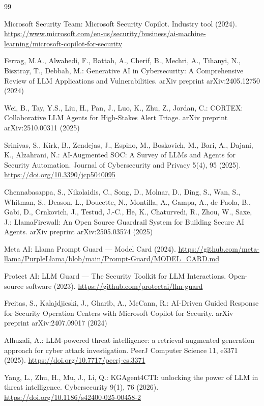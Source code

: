 \documentclass[twocolumn]{svjour3}
\begin{document}
\begin{thebibliography}{99}

Microsoft Security Team: Microsoft Security Copilot. Industry tool (2024). \url{https://www.microsoft.com/en-us/security/business/ai-machine-learning/microsoft-copilot-for-security}

Ferrag, M.A., Alwahedi, F., Battah, A., Cherif, B., Mechri, A., Tihanyi, N., Bisztray, T., Debbah, M.: Generative AI in Cybersecurity: A Comprehensive Review of LLM Applications and Vulnerabilities. arXiv preprint arXiv:2405.12750 (2024)

Wei, B., Tay, Y.S., Liu, H., Pan, J., Luo, K., Zhu, Z., Jordan, C.: CORTEX: Collaborative LLM Agents for High-Stakes Alert Triage. arXiv preprint arXiv:2510.00311 (2025)

Srinivas, S., Kirk, B., Zendejas, J., Espino, M., Boskovich, M., Bari, A., Dajani, K., Alzahrani, N.: AI-Augmented SOC: A Survey of LLMs and Agents for Security Automation. Journal of Cybersecurity and Privacy 5(4), 95 (2025). \url{https://doi.org/10.3390/jcp5040095}

Chennabasappa, S., Nikolaidis, C., Song, D., Molnar, D., Ding, S., Wan, S., Whitman, S., Deason, L., Doucette, N., Montilla, A., Gampa, A., de Paola, B., Gabi, D., Crnkovich, J., Testud, J.-C., He, K., Chaturvedi, R., Zhou, W., Saxe, J.: LlamaFirewall: An Open Source Guardrail System for Building Secure AI Agents. arXiv preprint arXiv:2505.03574 (2025)

Meta AI: Llama Prompt Guard --- Model Card (2024). \url{https://github.com/meta-llama/PurpleLlama/blob/main/Prompt-Guard/MODEL_CARD.md}

Protect AI: LLM Guard --- The Security Toolkit for LLM Interactions. Open-source software (2023). \url{https://github.com/protectai/llm-guard}

Freitas, S., Kalajdjieski, J., Gharib, A., McCann, R.: AI-Driven Guided Response for Security Operation Centers with Microsoft Copilot for Security. arXiv preprint arXiv:2407.09017 (2024)

Alhuzali, A.: LLM-powered threat intelligence: a retrieval-augmented generation approach for cyber attack investigation. PeerJ Computer Science 11, e3371 (2025). \url{https://doi.org/10.7717/peerj-cs.3371}

Yang, L., Zhu, H., Mu, J., Li, Q.: KGAgent4CTI: unlocking the power of LLM in threat intelligence. Cybersecurity 9(1), 76 (2026). \url{https://doi.org/10.1186/s42400-025-00458-2}


\end{thebibliography}
\end{document}
